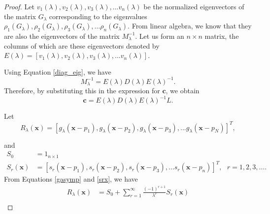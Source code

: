 \documentclass[multixcb]{amstext-l}
\theoremstyle{plain}
\theoremstyle{definition}
\theoremstyle{definition}
\theoremstyle{remark}
\numberwithin{equation}{chapter}
\begin{document}
\begin{proof}
 Let $v_1(\lambda),v_2(\lambda),v_3(\lambda),...v_n(\lambda)$ be the normalized eigenvectors of the matrix $G_{\lambda}$ corresponding to the eigenvalues $\rho_1(G_{\lambda}),\rho_2(G_{\lambda}),\rho_3(G_{\lambda}),\ldots\rho_n(G_{\lambda})$. From linear algebra, we know that they are also the eigenvectors of the matrix $M_{\lambda}^{-1}$. Let us form an $n\times n$ matrix, the columns of which are these eigenvectors denoted by $E(\lambda) = [v_1(\lambda),v_2(\lambda),v_3(\lambda),...v_n(\lambda)].$
 
 Using Equation \ref{diag_eig}, we have
 \begin{equation}\label{eq50}
 M_{\lambda}^{-1} = E(\lambda)D(\lambda)E(\lambda)^{-1}. 
 \end{equation}
 Therefore, by substituting this in the expression for $\boldsymbol{c}$, we obtain 
 \begin{equation}\label{eq51}
 \boldsymbol{c} = E(\lambda)D(\lambda)E(\lambda)^{-1}L.
 \end{equation}
 
 Let \begin{equation}\label{rx}
 R_{\lambda}(\boldsymbol{x}) = [g_{\lambda}(\boldsymbol{x}-p_1),g_{\lambda}(\boldsymbol{x}-p_2),g_{\lambda}(\boldsymbol{x}-p_3),...g_{\lambda}(\boldsymbol{x}-p_N)]^T,
 \end{equation}
 
 and \begin{equation}\label{srx}
 \begin{aligned}
 S_0 &= 1_{n\times 1}\\
 S_r(\boldsymbol{x}) &= [s_r(\boldsymbol{x}-p_1),s_r(\boldsymbol{x}-p_2),s_r(\boldsymbol{x}-p_3),\ldots s_r(\boldsymbol{x}-p_n)]^T, \mbox{    } r = 1,2,3,\ldots. 
 \end{aligned}
 \end{equation}
 From Equations \ref{gasymp} and \ref{srx}, we have
 \begin{equation}\label{equ}
 \begin{aligned}
  R_{\lambda}(\boldsymbol{x}) & = S_0 + \sum\limits_{r=1}^{\infty}\frac{(-1)^{r+1}}{\lambda^r}S_r(\boldsymbol{x})\\
  \end{aligned}
 \end{equation}
 

\end{proof}
\end{document}
